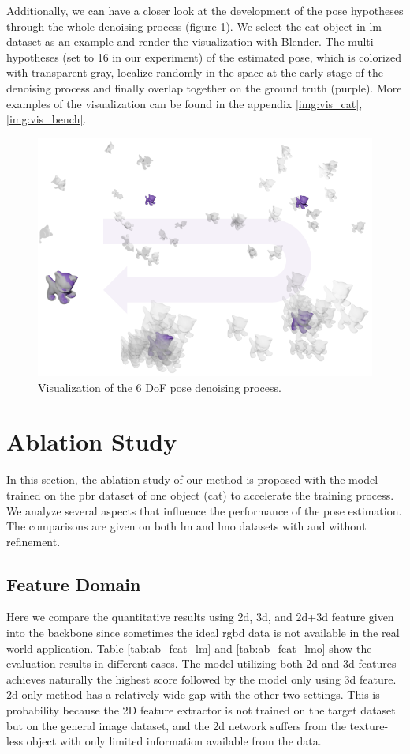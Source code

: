 \documentclass[12pt,DIV14,BCOR12mm,a4paper,footinclude=false,headinclude,parskip=half-,twoside,openright,cleardoublepage=empty,toc=index,bibliography=totoc,listof=totoc]{scrreprt}
\numberwithin{equation}{chapter}
\begin{document}
Additionally, we can have a closer look at the development of the pose hypotheses through the whole denoising process (figure \ref{img:eval_vis_denoise}). We select the cat object in \gls{lm} dataset as an example and render the visualization with Blender. The multi-hypotheses (set to 16 in our experiment) of the estimated pose, which is colorized with transparent gray, localize randomly in the space at the early stage of the denoising process and finally overlap together on the ground truth (purple). More examples of the visualization can be found in the appendix \ref{img:vis_cat}, \ref{img:vis_bench}.  
\begin{figure}[h]
	\centering
	\includegraphics[width=1.\textwidth]{img/vis_denoise.pdf}
	\caption{Visualization of the 6 DoF pose denoising process.}
	\label{img:eval_vis_denoise}
\end{figure}

\section{Ablation Study}
In this section, the ablation study of our method is proposed with the model trained on the \gls{pbr} dataset of one object (cat) to accelerate the training process. We analyze several aspects that influence the performance of the pose estimation. The comparisons are given on both \gls{lm} and \gls{lmo} datasets with and without refinement.
\subsection{Feature Domain}\label{sec:ab_feat}
Here we compare the quantitative results using \gls{2d}, \gls{3d}, and \gls{2d}+\gls{3d} feature given into the backbone since sometimes the ideal \gls{rgbd} data is not available in the real world application. Table \ref{tab:ab_feat_lm} and \ref{tab:ab_feat_lmo} show the evaluation results in different cases. The model utilizing both \gls{2d} and \gls{3d} features achieves naturally the highest score followed by the model only using \gls{3d} feature. \gls{2d}-only method has a relatively wide gap with the other two settings. This is probability because the 2D feature extractor is not trained on the target dataset but on the general image dataset, and the \gls{2d} network suffers from the texture-less object with only limited information available from the data.
\end{document}

